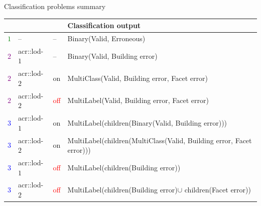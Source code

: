 \documentclass[export]{beamer}
\begin{document}
            \begin{frame}{Classification problems summary}
                \begin{table}
                    \tiny
                    \begin{center}
                        \begin{tabular}{x{.05\textwidth} x{.06\textwidth} x{.05\textwidth} x{.7\textwidth}}
                            \toprule
                             &  &  & \textbf{Classification output}\\
                            \midrule
                            \scriptsize
                            \textcolor{green}{$1$} & -- & -- & Binary(Valid, Erroneous)\\
                            \textcolor{purple}{$2$} & \acrshort{acr::lod}-$1$ & -- & Binary(Valid, Building error)\\
                            \textcolor{purple}{$2$} & \acrshort{acr::lod}-$2$ & \textcolor{IGNDarkGreen}{on} & MultiClass(Valid, Building error, Facet error)\\
                            \textcolor{purple}{$2$} & \acrshort{acr::lod}-$2$ & \textcolor{red}{off} & MultiLabel(Valid, Building error, Facet error)\\
                            \textcolor{blue}{$3$} & \acrshort{acr::lod}-$1$ & \textcolor{IGNDarkGreen}{on} & MultiLabel(children(Binary(Valid, Building error)))\\
                            \textcolor{blue}{$3$} & \acrshort{acr::lod}-$2$ & \textcolor{IGNDarkGreen}{on} & MultiLabel(children(MultiClass(Valid, Building error, Facet error)))\\
                            \textcolor{blue}{$3$} & \acrshort{acr::lod}-$1$ & \textcolor{red}{off} & MultiLabel(children(Building error))\\
                            \textcolor{blue}{$3$} & \acrshort{acr::lod}-$2$ & \textcolor{red}{off} & MultiLabel(children(Building error)$\cup$ children(Facet error))\\
                            \bottomrule
                        \end{tabular}
                    \end{center}
                \end{table}
            \end{frame}
\end{document}
